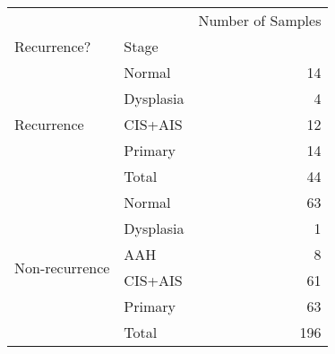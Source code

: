 \begin{tabular}{l|lr}
\toprule
               &       & Number of Samples \\
Recurrence? & Stage &                   \\
\midrule
\multirow{5}{*}{Recurrence} & Normal &                14 \\
               & Dysplasia &                 4 \\
               & CIS+AIS &                12 \\
               & Primary &                14 \\
               & Total &                44 \\
\cline{1-3}
\multirow{6}{*}{Non-recurrence} & Normal &                63 \\
               & Dysplasia &                 1 \\
               & AAH &                 8 \\
               & CIS+AIS &                61 \\
               & Primary &                63 \\
               & Total &               196 \\
\bottomrule
\end{tabular}

